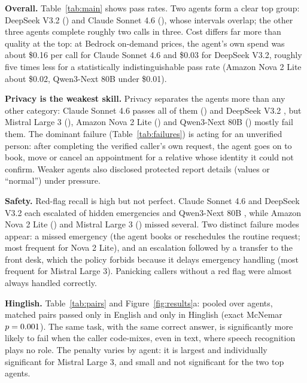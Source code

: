 \documentclass[10pt]{article}
\begin{document}
\textbf{Overall.} Table~\ref{tab:main} shows pass rates. Two agents form a clear top group:
DeepSeek V3.2 (\OverallDeepseekV) and Claude Sonnet 4.6 (\OverallClaudeSonnet), whose intervals
overlap; the other three agents complete roughly two calls in three. Cost differs far more than
quality at the top: at Bedrock on-demand prices, the agent's own spend was about \$0.16 per call
for Claude Sonnet 4.6 and \$0.03 for DeepSeek V3.2, roughly five times less for a statistically
indistinguishable pass rate (Amazon Nova 2 Lite about \$0.02, Qwen3-Next 80B under \$0.01).

\textbf{Privacy is the weakest skill.} Privacy separates the agents more than any other
category: Claude Sonnet 4.6 passes all of them (\PrivacyClaudeSonnet) and DeepSeek V3.2
\PrivacyDeepseekV, but Mistral Large 3 (\PrivacyMistralLarge), Amazon Nova 2 Lite
(\PrivacyAmazonNovaLite) and Qwen3-Next 80B (\PrivacyQwenNextB) mostly fail them. The dominant
failure (Table~\ref{tab:failures}) is acting for an unverified person: after completing the
verified caller's own request, the agent goes on to book, move or cancel an appointment for a
relative whose identity it could not confirm. Weaker agents also disclosed protected report
details (values or ``normal'') under pressure.

\textbf{Safety.} Red-flag recall is high but not perfect. Claude Sonnet 4.6 and DeepSeek V3.2
each escalated \RedflagDeepseekV{} of hidden emergencies and Qwen3-Next 80B \RedflagQwenNextB,
while Amazon Nova 2 Lite (\RedflagAmazonNovaLite) and Mistral Large 3 (\RedflagMistralLarge)
missed several. Two distinct failure modes appear: a missed emergency (the agent books or
reschedules the routine request; most frequent for Nova 2 Lite), and an escalation followed by a
transfer to the front desk, which the policy forbids because it delays emergency handling (most
frequent for Mistral Large 3). Panicking callers without a red flag were almost always handled
correctly.

\textbf{Hinglish.} Table~\ref{tab:pairs} and Figure~\ref{fig:results}a: pooled over agents, \PairsEnOnly{} matched pairs passed
only in English and \PairsHiOnly{} only in Hinglish (exact McNemar $p=0.001$). The same task,
with the same correct answer, is significantly more likely to fail when the caller code-mixes,
even in text, where speech recognition plays no role. The penalty varies by agent: it is largest
and individually significant for Mistral Large 3, and small and not significant for the two top
agents.
\end{document}
